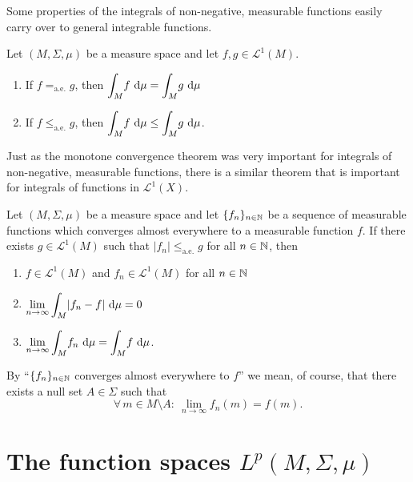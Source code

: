 Some properties of the integrals of non-negative, measurable functions easily carry over to general integrable functions.

\begin{lemma}
Let $(M,\Sigma,\mu)$ be a measure space and let $f,g \in \mathscr{L}^1(M)$. 
\begin{enumerate}[label=(\roman*)]
\item If $f=_{\mathrm{a.e.}}g$, then $\displaystyle \int_M\! f \, \mathop{}\!\mathrm{d} \mu = \int_M\! g \, \mathop{}\!\mathrm{d} \mu$
\item If $f\leq_{\mathrm{a.e.}}g$, then $\displaystyle \int_M\! f \, \mathop{}\!\mathrm{d} \mu \leq \int_M\! g \, \mathop{}\!\mathrm{d} \mu$.
\end{enumerate}
\end{lemma}

Just as the monotone convergence theorem was very important for integrals of non-negative, measurable functions, there is a similar theorem that is important for integrals of functions in $\mathscr{L}^1(X)$.

\begin{theorem}
Let $(M,\Sigma,\mu)$ be a measure space and let $\{f_n\}_{n\in\mathbb{N}}$ be a sequence of measurable functions which converges almost everywhere to a measurable function $f$. If there exists $g \in \mathscr{L}^1(M)$ such that $|f_n| \leq_{\mathrm{a.e.}} g$ for all $n \in \mathbb{N}$, then
\begin{enumerate}[label=(\roman*)]
\item $f \in \mathscr{L}^1(M)$ and $f_n \in \mathscr{L}^1(M)$ for all $n \in \mathbb{N}$
\item $\displaystyle \lim_{n \to \infty} \int_M \!  |f_n-f| \, \mathop{}\!\mathrm{d} \mu =0$
\item $\displaystyle \lim_{n \to \infty} \int_M \!  f_n \, \mathop{}\!\mathrm{d} \mu = \int_M \!  f \, \mathop{}\!\mathrm{d} \mu$.
\end{enumerate}
\end{theorem}

\begin{remark}
By ``$\{f_n\}_{n\in\mathbb{N}}$ converges almost everywhere to $f$'' we mean, of course, that there exists a null set $A\in\Sigma$ such that
\begin{equation*}
\forall \, m \in M\setminus A : \ \lim_{n\to\infty}f_n(m)=f(m).
\end{equation*}
\end{remark}


\section[\texorpdfstring{The function spaces $L^p(M,\Sigma,\mu)$}{The
function spaces Lp(M,Sigma,mu)}]{The function spaces $L^p(M,\Sigma,\mu)$}


